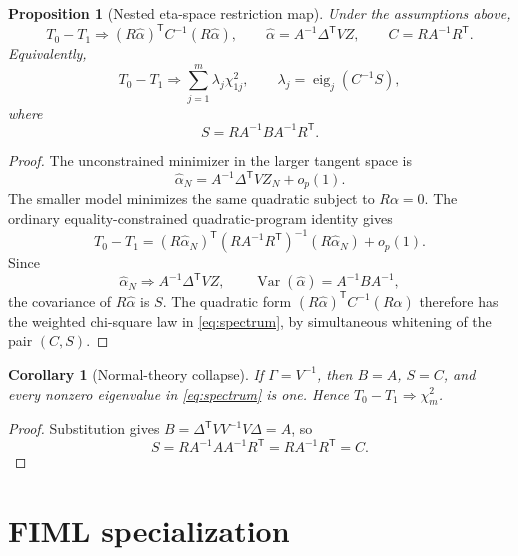 \documentclass[11pt]{article}
\newcommand{\Var}{\operatorname{Var}}
\newcommand{\eig}{\operatorname{eig}}
\newcommand{\T}{^{\mathsf T}}
\newcommand{\op}{o_p}
\theoremstyle{plain}
\newtheorem{proposition}{Proposition}
\newtheorem{corollary}{Corollary}
\theoremstyle{remark}
\begin{document}
\begin{proposition}[Nested eta-space restriction map]
\label{prop:restriction}
Under the assumptions above,
\[
  T_0-T_1
  \Rightarrow
  (R\hat\alpha)\T C^{-1}(R\hat\alpha),
  \qquad
  \hat\alpha=A^{-1}\Delta\T VZ,
  \qquad
  C=RA^{-1}R\T.
  \label{eq:wald-form}
\]
Equivalently,
\[
  T_0-T_1
  \Rightarrow
  \sum_{j=1}^m\lambda_j\chi^2_{1j},
  \qquad
  \lambda_j
  =
  \eig_j(C^{-1}S),
  \label{eq:spectrum}
\]
where
\[
  S=RA^{-1}BA^{-1}R\T .
\]
\end{proposition}

\begin{proof}
The unconstrained minimizer in the larger tangent space is
\[
  \hat\alpha_N
  =
  A^{-1}\Delta\T VZ_N+\op(1).
\]
The smaller model minimizes the same quadratic subject to \(R\alpha=0\). The
ordinary equality-constrained quadratic-program identity gives
\[
  T_0-T_1
  =
  (R\hat\alpha_N)\T(RA^{-1}R\T)^{-1}(R\hat\alpha_N)+\op(1).
\]
Since
\[
  \hat\alpha_N\Rightarrow A^{-1}\Delta\T VZ,\qquad
  \Var(\hat\alpha)=A^{-1}BA^{-1},
\]
the covariance of \(R\hat\alpha\) is \(S\). The quadratic form
\((R\hat\alpha)\T C^{-1}(R\hat\alpha)\) therefore has the weighted chi-square
law in \eqref{eq:spectrum}, by simultaneous whitening of the pair \((C,S)\).
\end{proof}

\begin{corollary}[Normal-theory collapse]
\label{cor:nt}
If \(\Gamma=V^{-1}\), then \(B=A\), \(S=C\), and every nonzero eigenvalue in
\eqref{eq:spectrum} is one. Hence \(T_0-T_1\Rightarrow\chi^2_m\).
\end{corollary}

\begin{proof}
Substitution gives \(B=\Delta\T VV^{-1}V\Delta=A\), so
\[
  S=RA^{-1}AA^{-1}R\T=RA^{-1}R\T=C.
\]
\end{proof}

\section{FIML specialization}
\label{sec:fiml}
\end{document}
